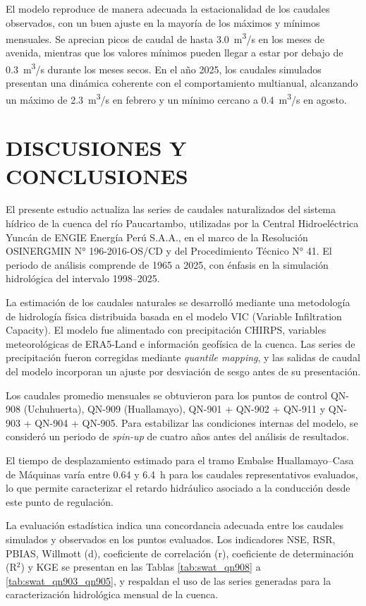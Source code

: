 El modelo reproduce de manera adecuada la estacionalidad de los caudales
observados, con un buen ajuste en la mayoría de los máximos y mínimos mensuales.
Se aprecian picos de caudal de hasta 3.0~m\textsuperscript{3}/s en los meses de
avenida, mientras que los valores mínimos pueden llegar a estar por debajo de
0.3~m\textsuperscript{3}/s durante los meses secos. En el año 2025, los caudales
simulados presentan una dinámica coherente con el comportamiento multianual,
alcanzando un máximo de 2.3~m\textsuperscript{3}/s en febrero y un mínimo
cercano a 0.4~m\textsuperscript{3}/s en agosto.

\newpage
\section{DISCUSIONES Y CONCLUSIONES}

El presente estudio actualiza las series de caudales naturalizados del sistema
hídrico de la cuenca del río Paucartambo, utilizadas por la Central
Hidroeléctrica Yuncán de ENGIE Energía Perú S.A.A., en el marco de la
Resolución OSINERGMIN N° 196-2016-OS/CD y del Procedimiento Técnico N° 41. El
periodo de análisis comprende de 1965 a 2025, con énfasis en la simulación
hidrológica del intervalo 1998--2025.

La estimación de los caudales naturales se desarrolló mediante una metodología
de hidrología física distribuida basada en el modelo VIC (Variable Infiltration
Capacity). El modelo fue alimentado con precipitación CHIRPS, variables
meteorológicas de ERA5-Land e información geofísica de la cuenca. Las series de
precipitación fueron corregidas mediante \textit{quantile mapping}, y las
salidas de caudal del modelo incorporan un ajuste por desviación de sesgo antes
de su presentación.

Los caudales promedio mensuales se obtuvieron para los puntos de control QN-908
(Uchuhuerta), QN-909 (Huallamayo), QN-901 + QN-902 + QN-911 y QN-903 + QN-904 +
QN-905. Para estabilizar las condiciones internas del modelo, se consideró un
periodo de \textit{spin-up} de cuatro años antes del análisis de resultados.

El tiempo de desplazamiento estimado para el tramo Embalse Huallamayo--Casa de
Máquinas varía entre 0.64 y 6.4~h para los caudales representativos evaluados,
lo que permite caracterizar el retardo hidráulico asociado a la conducción desde
este punto de regulación.

La evaluación estadística indica una concordancia adecuada entre los caudales
simulados y observados en los puntos evaluados. Los indicadores NSE, RSR, PBIAS,
Willmott (d), coeficiente de correlación (r), coeficiente de determinación
(R$^2$) y KGE se presentan en las Tablas \ref{tab:swat_qn908} a
\ref{tab:swat_qn903_qn905}, y respaldan el uso de las series generadas para la
caracterización hidrológica mensual de la cuenca.

